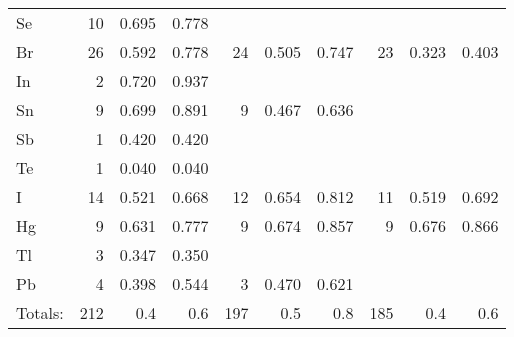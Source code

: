 \begin{table}
\begin{center}
\begin{tabular}{lrrrrrrrrr}
 Se &  10 &    0.695 &    0.778 &     &          &          &     &          &          \\
 Br &  26 &    0.592 &    0.778 &  24 &    0.505 &    0.747 &  23 &    0.323 &    0.403 \\
 In &   2 &    0.720 &    0.937 &     &          &          &     &          &          \\
 Sn &   9 &    0.699 &    0.891 &   9 &    0.467 &    0.636 &     &          &          \\
 Sb &   1 &    0.420 &    0.420 &     &          &          &     &          &          \\
 Te &   1 &    0.040 &    0.040 &     &          &          &     &          &          \\
  I &  14 &    0.521 &    0.668 &  12 &    0.654 &    0.812 &  11 &    0.519 &    0.692 \\
 Hg &   9 &    0.631 &    0.777 &   9 &    0.674 &    0.857 &   9 &    0.676 &    0.866 \\
 Tl &   3 &    0.347 &    0.350 &     &          &          &     &          &          \\
 Pb &   4 &    0.398 &    0.544 &   3 &    0.470 &    0.621 &     &          &          \\
 Totals: & 212  & 0.4  & 0.6   &  197   &0.5   &0.8   &  185   &0.4  & 0.6 \\ 
\hline
\end{tabular}
\end{center}
\end{table}
